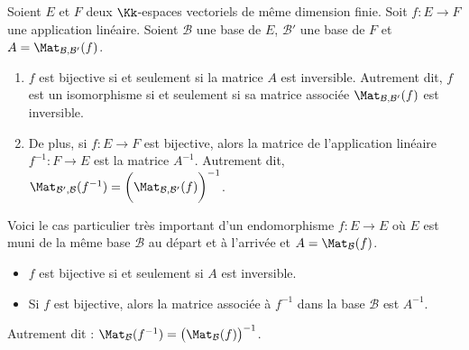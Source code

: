 \documentclass[class=report,crop=false]{standalone}
\begin{document}
\begin{theoreme}
\label{th:invmatlin}
Soient $E$ et $F$ deux $\Kk$-espaces vectoriels de même dimension finie.
Soit $f : E \to F$ une application linéaire. Soient $\mathcal{B}$ une base de $E$,
$\mathcal{B}'$ une base de $F$ et $A = \Mat_{\mathcal{B},\mathcal{B}'} (f)$.

\begin{enumerate}
  \item $f$ est bijective si et seulement si la matrice $A$ est inversible.
  Autrement dit, $f$ est un isomorphisme si et seulement si sa matrice associée
  $\Mat_{\mathcal{B},\mathcal{B}'}(f)$ est inversible.

  \item De plus, si $f : E \to F$ est bijective, alors la matrice de l'application linéaire
  $f^{-1} : F \to E$ est la matrice $A^{-1}$. Autrement dit,
  $\Mat_{\mathcal{B}',\mathcal{B}}(f^{-1}) = \bigg( \Mat_{\mathcal{B},\mathcal{B}'}(f) \bigg)^{-1}$.
\end{enumerate}
\end{theoreme}


Voici le cas particulier très important d'un endomorphisme $f : E \to E$ où
$E$ est muni de la même base $\mathcal{B}$ au départ et à l'arrivée
et $A = \Mat_{\mathcal{B}}(f)$.
\begin{corollaire}
\sauteligne
\begin{itemize}
  \item $f$ est bijective si et seulement si $A$ est inversible.

  \item Si $f$ est bijective, alors la matrice associée à $f^{-1}$ dans la base $\mathcal{B}$ est $A^{-1}$.
\end{itemize}
\end{corollaire}

Autrement dit : $\Mat_{\mathcal{B}}(f^{-1}) = \big(\Mat_{\mathcal{B}}(f) \big)^{-1}$.
\end{document}
